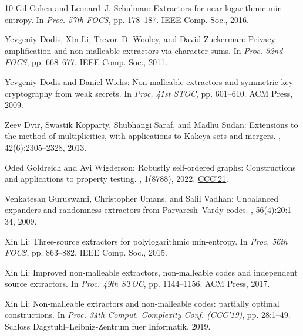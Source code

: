 \begin{thebibliography}{10}
{\sc Gil Cohen and Leonard~J. Schulman}: Extractors for near logarithmic
  min-entropy.
\newblock In {\em Proc. 57th FOCS}, pp. 178--187. IEEE Comp. Soc., 2016.

{\sc Yevgeniy Dodis, Xin Li, Trevor~D. Wooley, and David Zuckerman}: Privacy
  amplification and non-malleable extractors via character sums.
\newblock In {\em Proc. 52nd FOCS}, pp. 668--677. IEEE Comp. Soc., 2011.

{\sc Yevgeniy Dodis and Daniel Wichs}: Non-malleable extractors and symmetric
  key cryptography from weak secrets.
\newblock In {\em Proc. 41st STOC}, pp. 601--610. ACM Press, 2009.
\newblock [\epfmtdoi{10.1145/1536414.1536496}]

{\sc Zeev Dvir, Swastik Kopparty, Shubhangi Saraf, and Madhu Sudan}: Extensions
  to the method of multiplicities, with applications to {K}akeya sets and
  mergers.
, 42(6):2305--2328, 2013.
\newblock [\epfmtdoi{10.1137/100783704}]

{\sc Oded Goldreich and Avi Wigderson}: Robustly self-ordered graphs:
  Constructions and applications to property testing.
, 1(8788), 2022.
\newblock \prelim \href{https://doi.org/10.4230/LIPIcs.CCC.2021.12}{CCC'21}.

{\sc Venkatesan Guruswami, Christopher Umans, and Salil Vadhan}: Unbalanced
  expanders and randomness extractors from {P}arvaresh--{V}ardy codes.
, 56(4):20:1--34, 2009.
\newblock [\epfmtdoi{10.1145/1538902.1538904}]

{\sc Xin Li}: Three-source extractors for polylogarithmic min-entropy.
\newblock In {\em Proc. 56th FOCS}, pp. 863--882. IEEE Comp. Soc., 2015.

{\sc Xin Li}: Improved non-malleable extractors, non-malleable codes and
  independent source extractors.
\newblock In {\em Proc. 49th STOC}, pp. 1144--1156. ACM Press, 2017.
\newblock [\epfmtdoi{10.1145/3055399.3055486}]

{\sc Xin Li}: Non-malleable extractors and non-malleable codes: partially
  optimal constructions.
\newblock In {\em Proc. 34th Comput. Complexity Conf. (CCC'19)}, pp. 28:1--49.
  Schloss Dagstuhl--Leibniz-Zentrum fuer Informatik, 2019.


\end{thebibliography}
